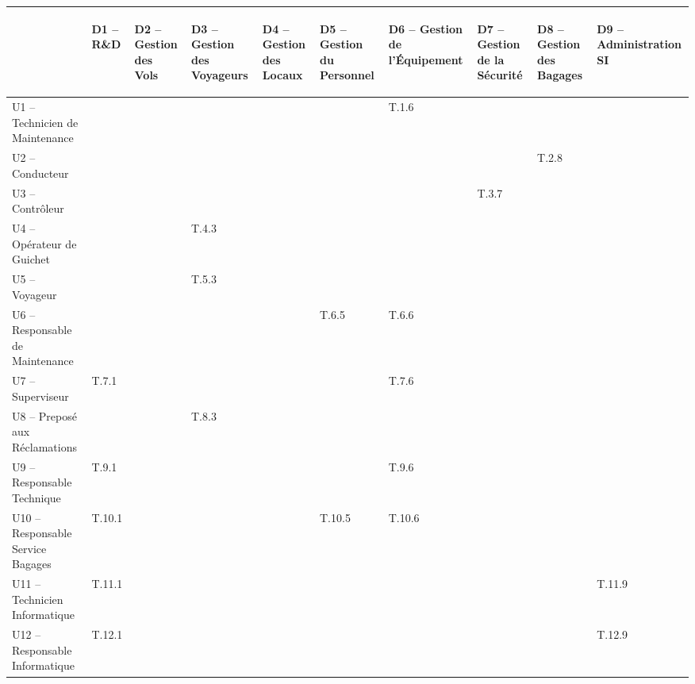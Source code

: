 \providecommand{\DJSPU}[1]{}

\vspace{-2cm}
\begin{turn}{-90}
\begin {tabular} {| l | l | l | l | l | l | l | l | l | l | }
\hline
~
&\begin{sideways}D1 -- R\&D\end{sideways}
&\begin{sideways}D2 -- Gestion des Vols\end{sideways}
&\begin{sideways}D3 -- Gestion des Voyageurs\end{sideways}
&\begin{sideways}D4 -- Gestion des Locaux\end{sideways}
&\begin{sideways}D5 -- Gestion du Personnel\end{sideways}
&\begin{sideways}D6 -- Gestion de l'Équipement\end{sideways}
&\begin{sideways}D7 -- Gestion de la Sécurité\end{sideways}
&\begin{sideways}D8 -- Gestion des Bagages\end{sideways}
&\begin{sideways}D9 -- Administration SI\end{sideways}\\
\hline
U1 --  Technicien de Maintenance  & & & & & &T.1.6 & & &  \\
\hline
U2 --  Conducteur  & & & & & & & &T.2.8 &  \\
\hline
U3 --  Contrôleur  & & & & & & &T.3.7 & &  \\
\hline
U4 --  Opérateur de Guichet  & & &T.4.3 & & & & & &  \\
\hline
U5 --  Voyageur  & & &T.5.3 & & & & & &  \\
\hline
U6 --  Responsable de Maintenance  & & & & &T.6.5 &T.6.6 & &  &\\
\hline
U7 --  Superviseur  &\DJSPU1 T.7.1 & & & & &T.7.6 & & &\\
\hline
U8 --  Preposé aux Réclamations  & & &T.8.3 & & & & & &\\
\hline
U9 --  Responsable Technique  &\DJSPU1 T.9.1 & & & & &T.9.6 & & &\\
\hline
U10 --  Responsable Service Bagages &T.10.1 & & & &T.10.5 &T.10.6 & & &  \\
\hline
U11 --  Technicien Informatique  &T.11.1 & & & & & & & &T.11.9  \\
\hline
U12 --  Responsable Informatique  &T.12.1 & & & & & & & &T.12.9  \\
\hline
\end {tabular}
\end{turn}

